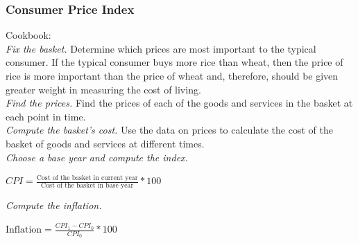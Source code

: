 \documentclass[shownotes,11pt, aspectratio=169]{beamer}
\begin{document}
\begin{frame}
\frametitle{Consumer Price Index}
Cookbook: \\
\textit{Fix the basket.} Determine which prices are most important to the typical consumer.
If the typical consumer buys more rice than wheat, then
the price of rice is more important than the price of wheat and,
therefore, should be given greater weight in measuring the cost of living. \\
\textit{Find the prices.} Find the prices of each of the goods and services in the basket
at each point in time. \\
\textit{Compute the basket's cost.} Use the data on prices to calculate the cost of the
basket of goods and services at different times. \\
\textit{Choose a base year and compute the index.} \\

\begin{center}
$ CPI = \frac{\text{Cost of the basket in current year}}{\text{Cost of the basket in base year}}*100$ \\
\end{center}


\textit{Compute the inflation.} \\
\begin{center}
$ \text{Inflation} = \frac{CPI_1 - CPI_0}{CPI_0}*100$
\end{center}

\end{frame}
\end{document}
